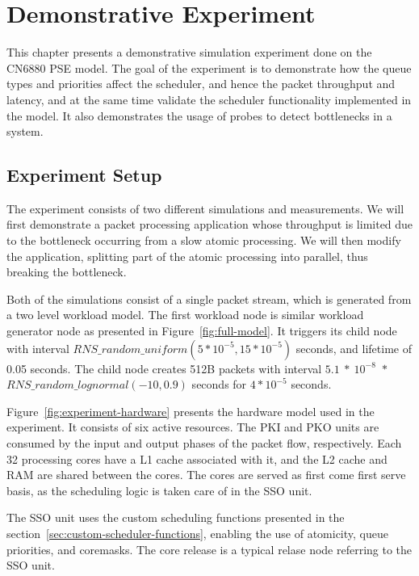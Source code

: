 \chapter{Demonstrative Experiment}
\label{chapter:demonstrative-experiment}

This chapter presents a demonstrative simulation experiment done on the CN6880 PSE model. The goal of the experiment is to demonstrate how the queue types and priorities affect the scheduler, and hence the packet throughput and latency, and at the same time validate the scheduler functionality implemented in the model. It also demonstrates the usage of probes to detect bottlenecks in a system.

\section{Experiment Setup}
\label{sec:experiment-setup}

The experiment consists of two different simulations and measurements. We will first demonstrate a packet processing application whose throughput is limited due to the bottleneck occurring from a slow atomic processing. We will then modify the application, splitting part of the atomic processing into parallel, thus breaking the bottleneck.

Both of the simulations consist of a single packet stream, which is generated from a two level workload model. The first workload node is similar workload generator node as presented in Figure~\ref{fig:full-model}. It triggers its child node with interval $RNS\_random\_uniform(5*10^{-5}, 15*10^{-5})$ seconds, and lifetime of 0.05 seconds. The child node creates 512B packets with interval $5.1~*~10^{-8}$~$*$~$RNS\_random\_lognormal(-10, 0.9)$ seconds for $4*10^{-5}$ seconds.

Figure~\ref{fig:experiment-hardware} presents the hardware model used in the experiment. It consists of six active resources. The PKI and PKO units are consumed by the input and output phases of the packet flow, respectively. Each 32 processing cores have a L1 cache associated with it, and the L2 cache and RAM are shared between the cores. The cores are served as first come first serve basis, as the scheduling logic is taken care of in the SSO unit.

The SSO unit uses the custom scheduling functions presented in the section~\ref{sec:custom-scheduler-functions}, enabling the use of atomicity, queue priorities, and coremasks. The core release is a typical relase node referring to the SSO unit.

